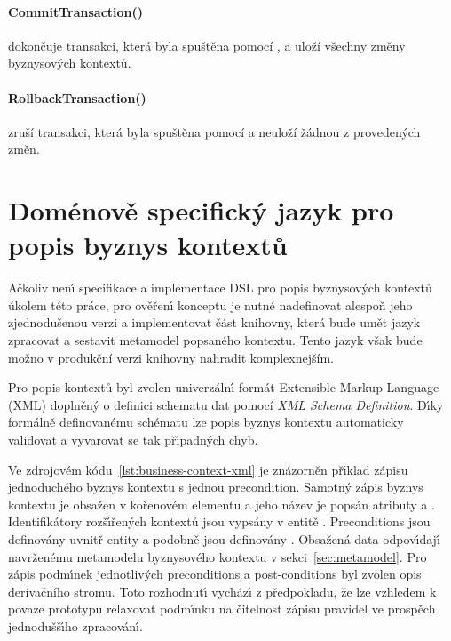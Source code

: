 \paragraph{CommitTransaction()} dokončuje transakci, která byla spuštěna pomocí ,
a uloží všechny změny byznysových kontextů.

\paragraph{RollbackTransaction()} zruší transakci, která byla spuštěna pomocí 
a neuloží žádnou z provedených změn.

\section{Doménově specifick\'y jazyk pro popis byznys kontextů}\label{sec:dsl-impl}

Ačkoliv nen\'{\i} specifikace a implementace \gls{DSL} pro popis byznysových kontextů
úkolem této práce, pro ověřen\'{\i} konceptu je nutné nadefinovat alespoň jeho zjednodušenou
verzi a implementovat část knihovny, která bude umět jazyk zpracovat a sestavit metamodel popsaného
kontextu. Tento jazyk však bude možno v produkční verzi knihovny nahradit komplexnejším.

Pro popis kontextů byl zvolen univerzáln\'{\i} formát Extensible
Markup Language (\gls{XML}) doplněný o definici schematu dat
pomocí \textit{XML Schema Definition}.
D\'{\i}ky formálně definovanému schématu lze popis byznys kontextu
automaticky validovat a vyvarovat se tak př\'{\i}padn\'ych chyb.

Ve zdrojovém kódu~\ref{lst:business-context-xml} je znázorněn
př\'{\i}klad zápisu jednoduchého byznys kontextu s jednou precondition.
Samotn\'y zápis byznys kontextu je obsažen v kořenovém elementu
 a jeho název je popsán atributy
 a . Identifikátory rozš\'{\i}řených kontextů jsou
vypsány v entitě . Preconditions jsou
definovány uvnitř entity  a podobně
jsou definovány . Obsažená data odpov\'{\i}daj\'{\i}
navrženému metamodelu byznysového kontextu v sekci~\ref{sec:metamodel}.
Pro zápis podm\'{\i}nek jednotliv\'ych preconditions a post-conditions byl zvolen
opis derivačního stromu. Toto rozhodnut\'{\i} vycház\'{\i} z předpokladu,
že lze vzhledem k povaze prototypu relaxovat podm\'{\i}nku
na čitelnost zápisu pravidel ve prospěch jednodušš\'{\i}ho zpracován\'{\i}.

